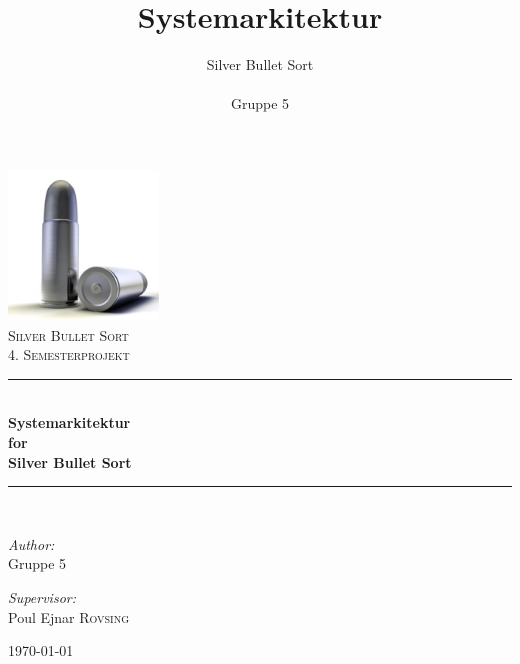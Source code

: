 \documentclass[Main.tex]{subfiles}
\begin{document}
\newcommand{\HRule}{\rule{\linewidth}{0.8mm}}
\author{Silver Bullet Sort\\\\Gruppe 5}
\title{Systemarkitektur}
\date{}

\begin{titlepage}

\begin{center}


\includegraphics[width=0.30\textwidth]{./Billeder/0_1_ForsideBillede.jpg}\\[1cm]    

\textsc{\LARGE Silver Bullet Sort}\\[1.5cm]

\textsc{\Large 4. Semesterprojekt}\\[0.5cm]


\HRule \\[0.4cm]

{ \huge \bfseries Systemarkitektur}\\[0.4cm]
{ \huge \bfseries for}\\[0.4cm] 
{ \huge \bfseries Silver Bullet Sort}\\[0.4cm]

\HRule \\[1.5cm]

\begin{minipage}{0.4\textwidth}
\begin{flushleft} \large
\emph{Author:}\\
Gruppe \textsc{5}
\end{flushleft}
\end{minipage}
\begin{minipage}{0.4\textwidth}
\begin{flushright} \large
\emph{Supervisor:} \\
Poul Ejnar \textsc{Rovsing}
\end{flushright}
\end{minipage}

\vfill

{\large \today}

\end{center}

\end{titlepage}
\end{document}
